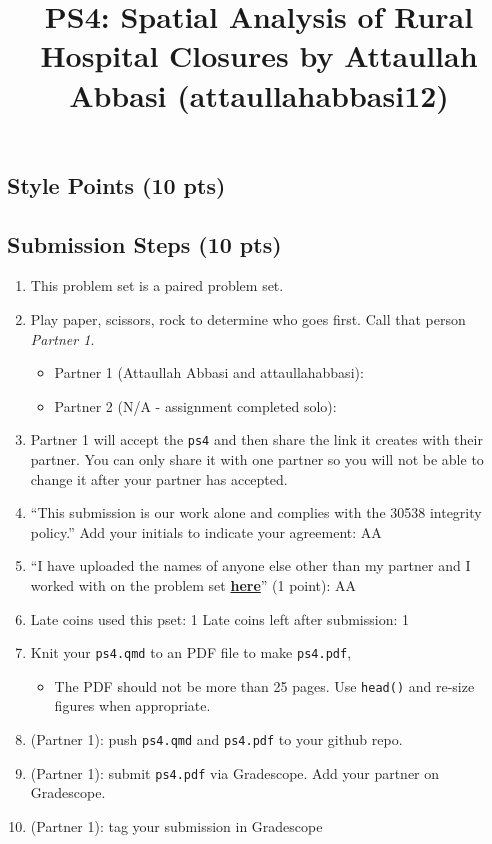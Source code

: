 \documentclass[
  letterpaper,
  DIV=11,
  numbers=noendperiod]{scrartcl}
\title{PS4: Spatial Analysis of Rural Hospital Closures by Attaullah
Abbasi (attaullahabbasi12)}
\author{}
\date{}
\providecommand{\tightlist}{%
  \setlength{\itemsep}{0pt}\setlength{\parskip}{0pt}}\usepackage{longtable,booktabs,array}
\begin{document}
\maketitle



\subsection{Style Points (10 pts)}\label{style-points-10-pts}

\subsection{Submission Steps (10 pts)}\label{submission-steps-10-pts}

\begin{enumerate}
\def\labelenumi{\arabic{enumi}.}
\tightlist
\item
  This problem set is a paired problem set.
\item
  Play paper, scissors, rock to determine who goes first. Call that
  person \emph{Partner 1}.

  \begin{itemize}
  \tightlist
  \item
    Partner 1 (Attaullah Abbasi and attaullahabbasi):
  \item
    Partner 2 (N/A - assignment completed solo):
  \end{itemize}
\item
  Partner 1 will accept the \texttt{ps4} and then share the link it
  creates with their partner. You can only share it with one partner so
  you will not be able to change it after your partner has accepted.
\item
  ``This submission is our work alone and complies with the 30538
  integrity policy.'' Add your initials to indicate your agreement: AA
\item
  ``I have uploaded the names of anyone else other than my partner and I
  worked with on the problem set
  \textbf{\href{https://docs.google.com/forms/d/185usrCREQaUbvAXpWhChkjghdGgmAZXA3lPWpXLLsts/edit}{here}}''
  (1 point): AA
\item
  Late coins used this pset: 1 Late coins left after submission: 1
\item
  Knit your \texttt{ps4.qmd} to an PDF file to make \texttt{ps4.pdf},

  \begin{itemize}
  \tightlist
  \item
    The PDF should not be more than 25 pages. Use \texttt{head()} and
    re-size figures when appropriate.
  \end{itemize}
\item
  (Partner 1): push \texttt{ps4.qmd} and \texttt{ps4.pdf} to your github
  repo.
\item
  (Partner 1): submit \texttt{ps4.pdf} via Gradescope. Add your partner
  on Gradescope.
\item
  (Partner 1): tag your submission in Gradescope
\end{enumerate}
\end{document}
